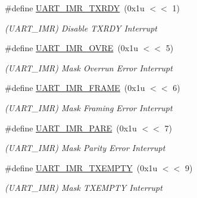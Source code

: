 \begin{DoxyCompactItemize}
\mbox{\label{group__SAMS70__UART_gaa2e5fea302bac49877aec951e51e9b0c}} 
\#define \mbox{\hyperlink{group__SAMS70__UART_gaa2e5fea302bac49877aec951e51e9b0c}{U\+A\+R\+T\+\_\+\+I\+M\+R\+\_\+\+T\+X\+R\+DY}}~(0x1u $<$$<$ 1)
\begin{DoxyCompactList}\small\item\em (U\+A\+R\+T\+\_\+\+I\+MR) Disable T\+X\+R\+DY Interrupt \end{DoxyCompactList}\item 
\mbox{\label{group__SAMS70__UART_gaa82ecc6b26ab61b19a3429c3c6e5db9d}} 
\#define \mbox{\hyperlink{group__SAMS70__UART_gaa82ecc6b26ab61b19a3429c3c6e5db9d}{U\+A\+R\+T\+\_\+\+I\+M\+R\+\_\+\+O\+V\+RE}}~(0x1u $<$$<$ 5)
\begin{DoxyCompactList}\small\item\em (U\+A\+R\+T\+\_\+\+I\+MR) Mask Overrun Error Interrupt \end{DoxyCompactList}\item 
\mbox{\label{group__SAMS70__UART_ga8e344ba0f5ba7b6260231fd76e930139}} 
\#define \mbox{\hyperlink{group__SAMS70__UART_ga8e344ba0f5ba7b6260231fd76e930139}{U\+A\+R\+T\+\_\+\+I\+M\+R\+\_\+\+F\+R\+A\+ME}}~(0x1u $<$$<$ 6)
\begin{DoxyCompactList}\small\item\em (U\+A\+R\+T\+\_\+\+I\+MR) Mask Framing Error Interrupt \end{DoxyCompactList}\item 
\mbox{\label{group__SAMS70__UART_gaa0e99651b173e6d5068be7926e28f446}} 
\#define \mbox{\hyperlink{group__SAMS70__UART_gaa0e99651b173e6d5068be7926e28f446}{U\+A\+R\+T\+\_\+\+I\+M\+R\+\_\+\+P\+A\+RE}}~(0x1u $<$$<$ 7)
\begin{DoxyCompactList}\small\item\em (U\+A\+R\+T\+\_\+\+I\+MR) Mask Parity Error Interrupt \end{DoxyCompactList}\item 
\mbox{\label{group__SAMS70__UART_gab691d22dc36d8eb128e61dd8fbc10bd4}} 
\#define \mbox{\hyperlink{group__SAMS70__UART_gab691d22dc36d8eb128e61dd8fbc10bd4}{U\+A\+R\+T\+\_\+\+I\+M\+R\+\_\+\+T\+X\+E\+M\+P\+TY}}~(0x1u $<$$<$ 9)
\begin{DoxyCompactList}\small\item\em (U\+A\+R\+T\+\_\+\+I\+MR) Mask T\+X\+E\+M\+P\+TY Interrupt \end{DoxyCompactList}\item 
$$
\end{DoxyCompactItemize}
